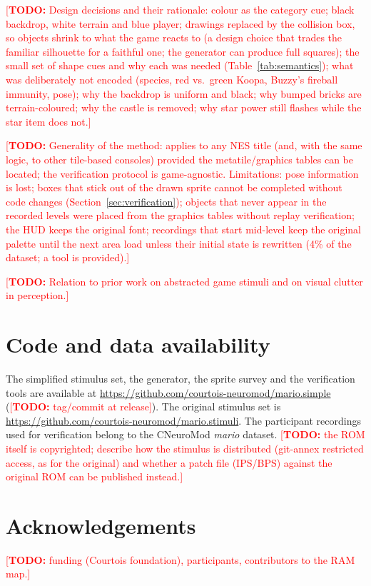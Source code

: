 \documentclass{article}
\newcommand{\TODO}[1]{\textcolor{red}{[\textbf{TODO:} #1]}}
\begin{document}
\TODO{Design decisions and their rationale: colour as the category cue; black backdrop, white terrain and blue player; drawings replaced by
the collision box, so objects shrink to what the game reacts to (a design choice that trades the
familiar silhouette for a faithful one; the generator can produce full squares); the small set of
shape cues and why each was needed (Table~\ref{tab:semantics}); what was deliberately not
encoded (species, red vs.\ green Koopa, Buzzy's fireball immunity, pose); why the backdrop is
uniform and black; why bumped bricks are terrain-coloured; why the castle is removed; why star power
still flashes while the star item does not.}

\TODO{Generality of the method: applies to any NES title (and, with the same logic, to other
tile-based consoles) provided the metatile/graphics tables can be located; the verification
protocol is game-agnostic. Limitations: pose information is lost; boxes that stick out of the
drawn sprite cannot be completed without code changes (Section~\ref{sec:verification}); objects
that never appear in the recorded levels were placed from the graphics tables without replay
verification; the HUD keeps the original font; recordings that start mid-level keep the original
palette until the next area load unless their initial state is rewritten (4\% of the dataset; a
tool is provided).}

\TODO{Relation to prior work on abstracted game stimuli and on visual clutter in perception.}


\section*{Code and data availability}
The simplified stimulus set, the generator, the sprite survey and the verification tools are
available at \url{https://github.com/courtois-neuromod/mario.simple} (\TODO{tag/commit at
release}). The original stimulus set is \url{https://github.com/courtois-neuromod/mario.stimuli}.
The participant recordings used for verification belong to the CNeuroMod \textit{mario}
dataset\cite{paugam2025mario}. \TODO{the ROM itself is copyrighted; describe how the stimulus is
distributed (git-annex restricted access, as for the original) and whether a patch file (IPS/BPS)
against the original ROM can be published instead.}

\section*{Acknowledgements}
\TODO{funding (Courtois foundation), participants, contributors to the RAM map.}
\end{document}
